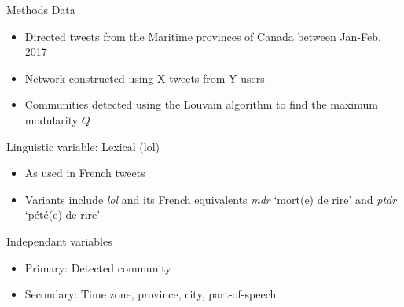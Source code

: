 \documentclass{beamer}\usepackage[]{graphicx}\usepackage[]{color}
\newcommand{\lexi}[1]{\textit{#1}}
\newcommand{\gloss}[1]{`#1'}
\begin{document}
\begin{frame}
\begin{columns}[t]
        \begin{block}{Methods}
          Data
          \begin{itemize}
            \item Directed tweets from the Maritime provinces of Canada between Jan-Feb, 2017
            \item Network constructed using X tweets from Y users
            \item Communities detected using the Louvain algorithm \parencite{blondel_fast_2008} to find the maximum modularity $Q$ \parencite{newman_finding_2004}
          \end{itemize}
          Linguistic variable: Lexical (lol)
          \begin{itemize}
            \item As used in French tweets
            \item Variants include \lexi{lol} and its French equivalents \lexi{mdr} \gloss{mort(e) de rire} and \lexi{ptdr} \gloss{pété(e) de rire}
          \end{itemize}
          Independant variables
          \begin{itemize}
            \item Primary: Detected community
            \item Secondary: Time zone, province, city, part-of-speech
          \end{itemize}
        \end{block}


\end{columns}
\end{frame}
\end{document}
